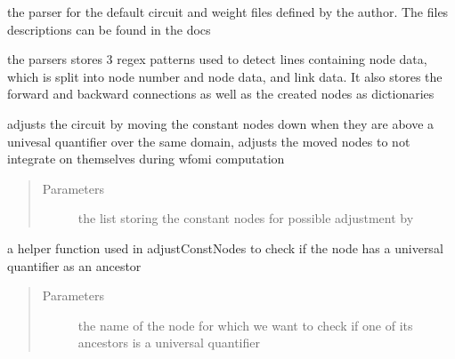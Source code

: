 \documentclass[letterpaper,10pt,english,openany,oneside]{sphinxmanual}
\begin{document}
\begin{fulllineitems}
\label{\detokenize{index:parser.Parser}}
the parser for the default circuit and weight files defined by the author. The files descriptions can be found in the docs

\begin{fulllineitems}
\label{\detokenize{index:parser.Parser.__init__}}
the parsers stores 3 regex patterns used to detect lines containing node data, which is split into node number and node data, 
and link data. It also stores the forward and backward connections as well as the created nodes as dictionaries

\end{fulllineitems}


\begin{fulllineitems}
\label{\detokenize{index:parser.Parser.adjustConstNodes}}
adjusts the circuit by moving the constant nodes down when they are above a univesal quantifier over the same domain,
adjusts the moved nodes to not integrate on themselves during wfomi computation
\begin{quote}\begin{description}
\item[{Parameters}] \leavevmode
{} \textendash{} the list storing the constant nodes for possible adjustment by {\hyperref[\detokenize{index:parser.Parser.adjustConstNodes}]{}}

\end{description}\end{quote}

\end{fulllineitems}


\begin{fulllineitems}
\label{\detokenize{index:parser.Parser.ancestorIsForAll}}
a helper function used in adjustConstNodes to check if the node has a universal quantifier as an ancestor
\begin{quote}\begin{description}
\item[{Parameters}] \leavevmode
{} \textendash{} the name of the node for which we want to check if one of its ancestors is a universal quantifier


\end{description}
\end{quote}
\end{fulllineitems}
\end{fulllineitems}
\end{document}
